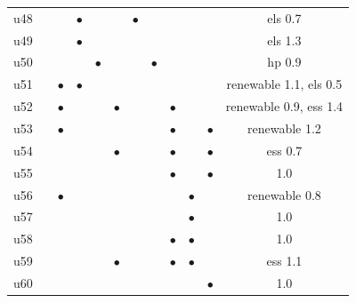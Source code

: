 \begin{table}[!t]
\begin{tabular}{@{}lccccccccccc@{}}
u48 &  &  & $\bullet$ &  &  & $\bullet$ &  &  &  &  & els 0.7 \\
u49 &  &  & $\bullet$ &  &  &  &  &  &  &  & els 1.3 \\
u50 &  &  &  & $\bullet$ &  &  & $\bullet$ &  &  &  & hp 0.9 \\
u51 &  & $\bullet$ & $\bullet$ &  &  &  &  &  &  &  & renewable 1.1, els 0.5 \\
u52 &  & $\bullet$ &  &  & $\bullet$ &  &  & $\bullet$ &  &  & renewable 0.9, ess 1.4 \\
u53 &  & $\bullet$ &  &  &  &  &  & $\bullet$ &  & $\bullet$ & renewable 1.2 \\
u54 &  &  &  &  & $\bullet$ &  &  & $\bullet$ &  & $\bullet$ & ess 0.7 \\
u55 &  &  &  &  &  &  &  & $\bullet$ &  & $\bullet$ & 1.0 \\
u56 &  & $\bullet$ &  &  &  &  &  &  & $\bullet$ &  & renewable 0.8 \\
u57 &  &  &  &  &  &  &  &  & $\bullet$ &  & 1.0 \\
u58 &  &  &  &  &  &  &  & $\bullet$ & $\bullet$ &  & 1.0 \\
u59 &  &  &  &  & $\bullet$ &  &  & $\bullet$ & $\bullet$ &  & ess 1.1 \\
u60 &  &  &  &  &  &  &  &  &  & $\bullet$ & 1.0 \\
\bottomrule
\end{tabular}
\end{table}
